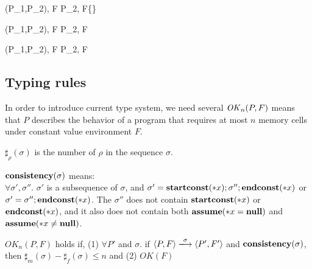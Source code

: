 { \langle \Sirx (P_1,P_2), F \rangle \rightarrow \langle P_2, F\cup\{\snnull\} \rangle }

{ \langle \Sirx (P_1,P_2), F \rangle \rightarrow \langle P_2, F \rangle }

{ \langle \Sirx (P_1,P_2), F \rangle \rightarrow \langle P_2, F \rangle }






\subsection{Typing rules}

In order to introduce current type system, we need several
\(\mathit{OK}_n(P,F)\) means that \(P\) describes the behavior of a program
that requires at most \(n\) memory cells under constant value
environment \(F\).

\begin{myDef}[\(\sharp_{\rho}(\sigma)\)]
\label{df:sharf}
\(\sharp_{\rho}(\sigma)\) is the number of \(\rho\) in the sequence
\(\sigma\).
\end{myDef}

\begin{myDef}
\label{df:const}
\(\mathbf{consistency}(\sigma)\) means:\\
\( \forall \sigma',\sigma''\). \(\sigma'\) is a subsequence
of \(\sigma\), and \(\sigma' = \mathbf{startconst}(*x);\sigma'';\mathbf{endconst}(*x)\) or \(\sigma' = \sigma'';\mathbf{endconst}(*x)\). The \(\sigma''\) does not contain \(\mathbf{startconst}(*x)\) or \(\mathbf{endconst}(*x) \), and it also does not contain both \(\mathbf{assume}(*x = \mathbf{null})\) and \(\mathbf{assume}(*x \ne \mathbf{null})\).
\end{myDef}


\begin{myDef}
\label{df:okn}
\(OK_{n}(P, F)\) holds if, (1) \( \forall P'\) and \(\sigma\). if \( \langle P, F \rangle
\xlongrightarrow{\sigma} \langle P', F' \rangle \) and \(\mathbf{consistency}(\sigma)\), then \( \sharp_m(\sigma) - \sharp_f(\sigma) \le n\) and (2) \( OK(F) \)
\end{myDef}

